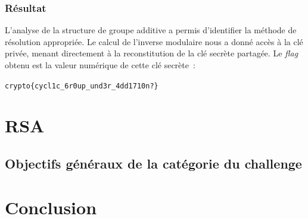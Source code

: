 \documentclass[12pt, a4paper]{article}
\begin{document}
    \subsubsection{Résultat}
    L'analyse de la structure de groupe additive a permis d'identifier la
    méthode de résolution appropriée. Le calcul de l'inverse modulaire nous a
    donné accès à la clé privée, menant directement à la reconstitution de la
    clé secrète partagée. Le \textit{flag} obtenu est la valeur numérique de
    cette clé secrète~:

    \begin{center}
        \texttt{crypto\{cycl1c\_6r0up\_und3r\_4dd1710n?\}}
    \end{center}

    \section{RSA}
    \subsection{Objectifs généraux de la catégorie du challenge}

    \section{Conclusion}
\end{document}
